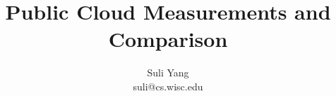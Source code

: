 \documentclass[letterpaper,twocolumn,10pt]{article}
\begin{document}
\title{\Large \bf Public Cloud Measurements and Comparison}

\author{
{\rm Suli Yang}\\
suli@cs.wisc.edu
} %

\maketitle









{}

\end{document}
